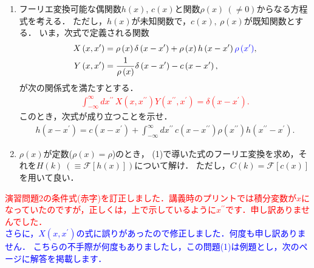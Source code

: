 \begin{enumerate}[(1)]
  \item フーリエ変換可能な偶関数$h\left(x\right)$, $c\left(x\right)$と関数$\rho\left(x\right)~(\neq 0)$からなる方程式を考える．
	ただし，$h\left(x\right)$が未知関数で，$c(x),~\rho\left(x\right)$が既知関数とする．
	いま，次式で定義される関数
	\begin{align*}
	  X\left(x,x^{\prime}\right) &= \rho\left(x\right)\delta\left(x-x^\prime\right) + \rho\left(x\right)h\left(x-x^\prime\right)\textcolor{blue}{\rho\left(x^{\prime}\right)}, \\
	  Y\left(x,x^{\prime}\right) &= \dfrac{1}{\rho\left(x\right)}\delta\left(x-x^\prime\right)-c\left(x-x^\prime\right),
	\end{align*}
	が次の関係式を満たすとする．
	\textcolor{red}{
	\begin{align*}
	  \int_{-\infty}^{\infty}dx^{\prime\prime}\,X(x,x^{\prime\prime})Y(x^{\prime\prime},x^{\prime}) = \delta\left(x-x^{\prime}\right).
	\end{align*}
	}
	このとき，次式が成り立つことを示せ．
	\begin{align*}
	  h\left(x-x^{\prime}\right) = c\left(x-x^{\prime}\right) + \int_{-\infty}^{\infty}dx^{\prime\prime}\,c(x-x^{\prime\prime})\rho(x^{\prime\prime})h\left(x^{\prime\prime}-x^{\prime}\right).
	\end{align*}
  \item $\rho(x)$が定数($\rho(x) = \rho$)のとき，
	(1)で導いた式のフーリエ変換を求め，それを$H(k)~(\equiv \mathcal{F}\left[h(x)\right])$について解け．
	ただし，$C(k) = \mathcal{F}\left[c(x)\right]$を用いて良い．
\end{enumerate}

\noindent
\textcolor{red}{
\quad 演習問題2の条件式(赤字)を訂正しました．講義時のプリントでは積分変数が$x$になっていたのですが，正しくは，上で示しているように$x^{\prime\prime}$です．申し訳ありませんでした．
}
\\
\textcolor{blue}{
さらに，$X(x,x^{\prime})$の式に誤りがあったので修正しました．何度も申し訳ありません．
こちらの不手際が何度もありましたし，この問題(1)は例題とし，次のページに解答を掲載します．
}
%
\newpage
%
\noindent
{}

